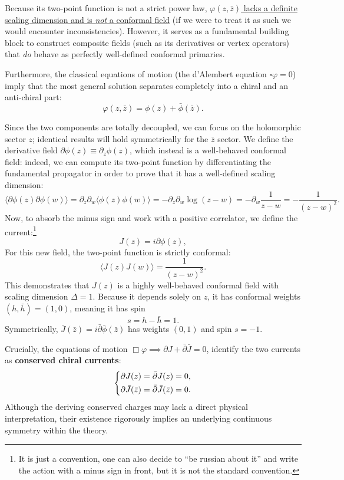 Because its two-point function is not a strict power law, \uline{\(\varphi(z, \bar{z})\) lacks a definite scaling dimension and is \textit{not} a conformal field} (if we were to treat it as such we would encounter inconsistencies). However, it serves as a fundamental building block to construct composite fields (such as its derivatives or vertex operators) that \textit{do} behave as perfectly well-defined conformal primaries.

Furthermore, the classical equations of motion (the d'Alembert equation \(\square \varphi = 0\)) imply that the most general solution separates completely into a chiral and an anti-chiral part:
\[
    \varphi(z, \bar{z}) = \phi(z) + \bar{\phi}(\bar{z}).
\]

Since the two components are totally decoupled, we can focus on the holomorphic sector \(z\); identical results will hold symmetrically for the \(\bar{z}\) sector. We define the derivative field \(\partial\phi(z) \equiv \partial_z \phi(z)\), which instead is a well-behaved conformal field: indeed, we can compute its two-point function by differentiating the fundamental propagator in order to prove that it has a well-defined scaling dimension:
\[
    \langle \partial\phi(z) \partial\phi(w) \rangle = \partial_z \partial_w \langle \phi(z) \phi(w) \rangle = - \partial_z \partial_w \log(z - w) = - \partial_w \frac{1}{z - w} = - \frac{1}{(z - w)^2}.
\]
Now, to absorb the minus sign and work with a positive correlator, we define the current:\footnote{It is just a convention, one can also decide to ``be russian about it'' and write the action with a minus sign in front, but it is not the standard convention.}
\[
    J(z) = i \partial\phi(z),
\]
For this new field, the two-point function is strictly conformal:
\[
    \langle J(z) J(w) \rangle = \frac{1}{(z - w)^2}.
\]
This demonstrates that \(J(z)\) is a highly well-behaved conformal field with scaling dimension \(\Delta = 1\). Because it depends solely on \(z\), it has conformal weights \((h, \bar{h}) = (1,0)\), meaning it has spin
\[
    s = h - \bar{h} = 1.
\]
Symmetrically, \(\bar{J}(\bar{z}) = i \bar{\partial}\bar{\phi}(\bar{z})\) has weights \((0,1)\) and spin \(s = -1\).

Crucially, the equations of motion \(\Box \varphi \implies \partial J + \bar{\partial} \bar{J} = 0\),
identify the two currents as \textbf{conserved chiral currents}:
\[
    \begin{dcases}
        \partial J(z) = \bar{\partial} J(z) = 0, \\
        \partial \bar{J}(\bar{z}) = \bar{\partial} \bar{J}(\bar{z}) = 0.
    \end{dcases}
\]
Although the deriving conserved charges may lack a direct physical interpretation, their existence rigorously implies an underlying continuous symmetry within the theory.

